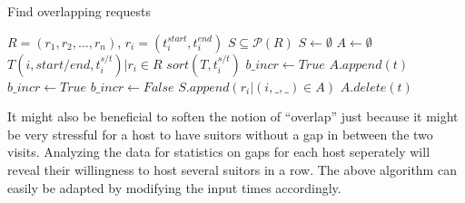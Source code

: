 \documentclass[11pt]{article}
\begin{document}
\begin{algorithm}
\caption{Find overlapping requests}
\label{alg:overlap}
\begin{algorithmic} 
\REQUIRE $R = (r_1, r_2,\ldots,r_n)$, $r_i = (t_i^{start}, t_i^{end})$
\ENSURE $S\subseteq \mathcal{P}(R)$ 
\STATE $S \leftarrow \emptyset$
\STATE $A \leftarrow \emptyset$ 
\STATE $T {(i, start/end, t_i^{s/t}) |r_i \in R}$
\STATE $sort(T, t_i^{s/t})$ 
\STATE $b\_incr \leftarrow True$ 
\STATE $A.append(t)$
\STATE $b\_incr \leftarrow True$
\ELSE
{}
\STATE $b\_incr \leftarrow False$
\STATE $S.append({r_i | (i, \_, \_) \in A})$
\ENDIF
\STATE $A.delete(t)$
\ENDIF
\ENDFOR
\end{algorithmic}
\end{algorithm}

It might also be beneficial to soften the notion of ``overlap'' just because it might be very stressful for a host to have suitors without a gap in between the two visits. Analyzing the data for statistics on gaps for each host seperately will reveal their willingness to host several suitors in a row. The above algorithm can easily be adapted by modifying the input times accordingly.
\end{document}
